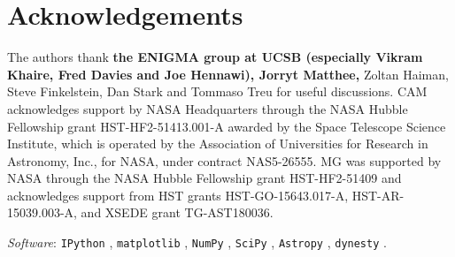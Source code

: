 \documentclass[fleqn,usenatbib]{mnras}
\providecommand{\DIFadd}[1]{{\protect\color{Green} {\bf #1}}} %
\providecommand{\DIFaddbegin}{} %
\providecommand{\DIFaddend}{} %
\newcommand{\DIFaddincludegraphics}[2][]{{\color{purple}\fbox{\DIFOincludegraphics[#1]{#2}}}} %
\DeclareRobustCommand{\DIFaddbegin}{\DIFOaddbegin \let\includegraphics\DIFaddincludegraphics} %
\DeclareRobustCommand{\DIFaddend}{\DIFOaddend \let\includegraphics\DIFOincludegraphics} %
\begin{document}
\section*{Acknowledgements}

The authors thank \DIFaddbegin \DIFadd{the ENIGMA group at UCSB (especially Vikram Khaire, Fred Davies and Joe Hennawi), Jorryt Matthee, }\DIFaddend Zoltan Haiman, Steve Finkelstein, Dan Stark and Tommaso Treu for useful discussions. CAM acknowledges support by NASA Headquarters through the NASA Hubble Fellowship grant HST-HF2-51413.001-A awarded by the Space Telescope Science Institute, which is operated by the Association of Universities for Research in Astronomy, Inc., for NASA, under contract NAS5-26555. MG was supported by NASA through the NASA Hubble Fellowship grant HST-HF2-51409 and acknowledges support from HST grants HST-GO-15643.017-A, HST-AR-15039.003-A, and XSEDE grant TG-AST180036.

\noindent
\textit{Software}: \verb|IPython| \citep{Perez2007a}, \verb|matplotlib| \citep{Hunter2007a}, \verb|NumPy| \citep{VanderWalt2011a}, \verb|SciPy| \citep{Oliphant2007a}, \verb|Astropy| \citep{Robitaille2013}, \verb|dynesty| \citep{Speagle2019}.







\bsp	%
\label{lastpage}
\end{document}
